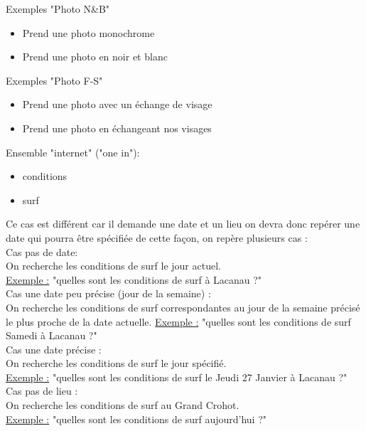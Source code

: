 Exemples "Photo N\&B"
\begin{itemize}
    \item Prend une {\color{red}photo monochrome}
    \item Prend une {\color{red}photo} en {\color{red} noir et blanc} \\
\end{itemize}

Exemples "Photo F-S"
\begin{itemize}
    \item Prend une {\color{red}photo} avec un {\color{red}échange} de visage
    \item Prend une {\color{red}photo} en {\color{red}échangeant} nos visages\\
\end{itemize}

Ensemble "internet" {\color{red}("one in")}:
\begin{itemize}
    \item conditions
    \item surf \\
\end{itemize}

Ce cas est différent car il demande une date et un lieu on devra donc repérer une date qui pourra être spécifiée de cette façon, on repère plusieurs cas : \\

Cas pas de date: \\
On recherche les conditions de surf le jour actuel.\\
\underline{Exemple :} "quelles sont les conditions de surf à Lacanau ?" \\

Cas une date peu précise (jour de la semaine)  : \\
On recherche les conditions de surf correspondantes au jour de la semaine précisé le plus proche de la date actuelle.
\underline{Exemple :} "quelles sont les conditions de surf Samedi à Lacanau ?" \\

Cas une date précise : \\
On recherche les conditions de surf le jour spécifié. \\
\underline{Exemple :} "quelles sont les conditions de surf le Jeudi 27 Janvier à Lacanau ?" \\

Cas pas de lieu : \\
On recherche les conditions de surf au Grand Crohot. \\
\underline{Exemple :} "quelles sont les conditions de surf aujourd'hui ?" \\

